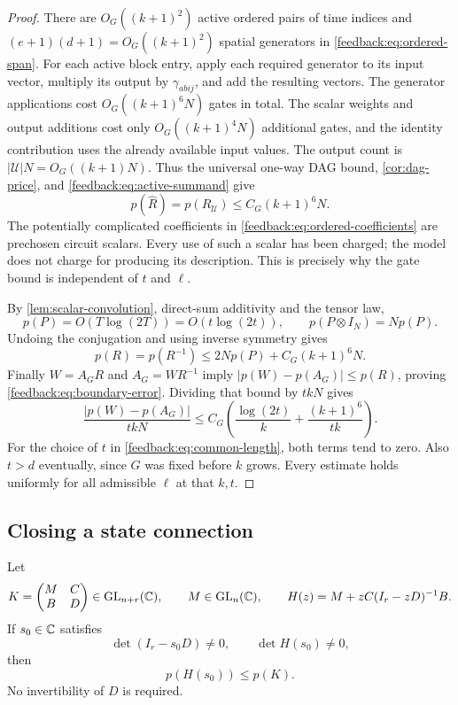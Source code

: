 \begin{proof}
There are $O_G((k+1)^2)$ active ordered pairs of time indices and
$(e+1)(d+1)=O_G((k+1)^2)$ spatial generators in
\cref{feedback:eq:ordered-span}.  For each active block entry, apply
each required generator to its input vector, multiply its output by
$\gamma_{abij}$, and add the resulting vectors.  The generator
applications cost $O_G((k+1)^6N)$ gates in total.  The scalar weights
and output additions cost only $O_G((k+1)^4N)$ additional gates, and
the identity contribution uses the already available input values.
The output count is $|\mathcal U|N=O_G((k+1)N)$.  Thus the universal
one-way DAG bound, \cref{cor:dag-price}, and
\cref{feedback:eq:active-summand} give
\begin{equation}
 p(\widehat R)=p(R_{\mathcal U})
        \leq C_G(k+1)^6N.
 \label{feedback:eq:active-cost}
\end{equation}
The potentially complicated coefficients in
\cref{feedback:eq:ordered-coefficients} are prechosen circuit scalars.
Every use of such a scalar has been charged; the model does not charge
for producing its description.  This is precisely why the gate bound
is independent of $t$ and $\ell$.

By \cref{lem:scalar-convolution}, direct-sum additivity and the tensor
law,
\[
 p(P)=O(T\log(2T))=O(t\log(2t)),\qquad
 p(P\otimes I_N)=Np(P).
\]
Undoing the conjugation and using inverse symmetry gives
\[
 p(R)=p(R^{-1})\leq2Np(P)+C_G(k+1)^6N.
\]
Finally $W=A_GR$ and $A_G=WR^{-1}$ imply
$|p(W)-p(A_G)|\leq p(R)$, proving
\cref{feedback:eq:boundary-error}.  Dividing that bound by $tkN$ gives
\begin{equation}
 \frac{|p(W)-p(A_G)|}{tkN}
 \leq C_G\left(\frac{\log(2t)}{k}
           +\frac{(k+1)^6}{tk}\right).
 \label{feedback:eq:normalized-error}
\end{equation}
For the choice of $t$ in \cref{feedback:eq:common-length}, both terms tend to zero.  Also
$t>d$ eventually, since $G$ was fixed before $k$ grows.  Every estimate
holds uniformly for all admissible $\ell$ at that $k,t$.
\end{proof}

\subsection{Closing a state connection}

\begin{samepage}
\begin{theorem}
\label{thm:feedback}
Let
\[
 K=\begin{pmatrix}M&C\\B&D\end{pmatrix}\in\operatorname{GL}_{n+r}(\mathbb C),
 \qquad M\in\operatorname{GL}_n(\mathbb C),
 \qquad H(z)=M+zC(I_r-zD)^{-1}B.
\]
If $s_0\in\mathbb C$ satisfies
\[
 \det(I_r-s_0D)\ne0,\qquad \det H(s_0)\ne0,
\]
then
\begin{equation}
 p(H(s_0))\leq p(K).
 \label{feedback:eq:feedback-law}
\end{equation}
No invertibility of $D$ is required.
\end{theorem}
\end{samepage}

